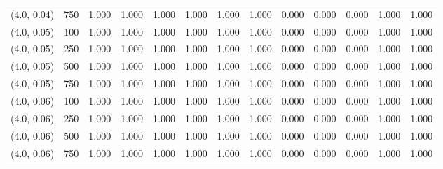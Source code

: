 \begin{table}[ht]
{\begin{tabular}{ll|ccccccccccc}
			(4.0, 0.04) & 750 & 1.000 & 1.000 & 1.000 & 1.000 & 1.000 & 1.000 & 0.000 & 0.000 & 0.000 & 1.000 & 1.000 \\
			(4.0, 0.05) & 100 & 1.000 & 1.000 & 1.000 & 1.000 & 1.000 & 1.000 & 0.000 & 0.000 & 0.000 & 1.000 & 1.000 \\
			(4.0, 0.05) & 250 & 1.000 & 1.000 & 1.000 & 1.000 & 1.000 & 1.000 & 0.000 & 0.000 & 0.000 & 1.000 & 1.000 \\
			(4.0, 0.05) & 500 & 1.000 & 1.000 & 1.000 & 1.000 & 1.000 & 1.000 & 0.000 & 0.000 & 0.000 & 1.000 & 1.000 \\
			(4.0, 0.05) & 750 & 1.000 & 1.000 & 1.000 & 1.000 & 1.000 & 1.000 & 0.000 & 0.000 & 0.000 & 1.000 & 1.000 \\
			(4.0, 0.06) & 100 & 1.000 & 1.000 & 1.000 & 1.000 & 1.000 & 1.000 & 0.000 & 0.000 & 0.000 & 1.000 & 1.000 \\
			(4.0, 0.06) & 250 & 1.000 & 1.000 & 1.000 & 1.000 & 1.000 & 1.000 & 0.000 & 0.000 & 0.000 & 1.000 & 1.000 \\
			(4.0, 0.06) & 500 & 1.000 & 1.000 & 1.000 & 1.000 & 1.000 & 1.000 & 0.000 & 0.000 & 0.000 & 1.000 & 1.000 \\
			(4.0, 0.06) & 750 & 1.000 & 1.000 & 1.000 & 1.000 & 1.000 & 1.000 & 0.000 & 0.000 & 0.000 & 1.000 & 1.000 \\
			\hline
		\end{tabular}
		
	}
\end{table}




